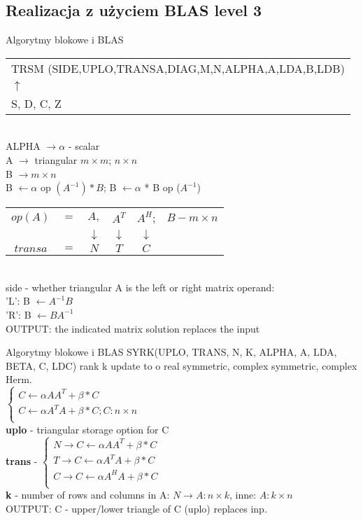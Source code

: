 	\subsection{Realizacja z użyciem BLAS level 3}
	\begin{frame}{Algorytmy blokowe i BLAS}
		\begin{tabular}{ l }
			\textunderscore TRSM (SIDE,UPLO,TRANSA,DIAG,M,N,ALPHA,A,LDA,B,LDB) \\
		   $\uparrow$ \\
		   S, D, C, Z \\
		\end{tabular} \\ 
		ALPHA $\rightarrow \alpha$ - scalar \\
		A $\rightarrow$ triangular $m \times m$; $n \times n$ \\
		B $\rightarrow m \times n$ \\
		B $\leftarrow \alpha$ op $(A^{-1})*B$; B $\leftarrow \alpha$ * B op ($A^{-1}$)
		\begin{tabular}{ c c c c c c }
			$ op(A) $ & $ = $ & $ A, $ & $ A^T $ & $A^H $; & $ B - m \times n $ \\
			 & & $\downarrow$ & $\downarrow$ & $\downarrow$ & \\
			 $ transa $ & $ = $ & $ N $ & $ T $ & $ C $ & 		
		\end{tabular} \\ 
		side - whether triangular A is the left or right matrix operand: \\
		'L': B $\leftarrow A^{-1}B$ \\
		'R': B $\leftarrow BA^{-1}$ \\
		OUTPUT: the indicated matrix solution replaces the input
	\end{frame}
	
	\begin{frame}{Algorytmy blokowe i BLAS}
		\textunderscore SYRK(UPLO, TRANS, N, K, ALPHA, A, LDA, BETA, C, LDC)
		rank k update to o real symmetric, complex symmetric, complex Herm. \\ 
		$
		\begin{cases}
			C \leftarrow \alpha A A^T + \beta * C \\
			C \leftarrow \alpha A^T A + \beta * C; C: n \times n \\
		\end{cases}
		$ \\
		\textbf{uplo} - triangular storage option for C \\
		\textbf{trans} - $
		\begin{cases}
			N \rightarrow C \leftarrow \alpha A A^T + \beta * C \\
			T \rightarrow C \leftarrow \alpha A^T A + \beta * C \\
			C \rightarrow C \leftarrow \alpha A^H A + \beta * C \\
		\end{cases}$ \\
		\textbf{k} - number of rows and columns in A: $N \rightarrow A: n \times k$, inne: $A: k \times n$ \\
		OUTPUT: C - upper/lower triangle of C (uplo) replaces inp.
	\end{frame}
	
